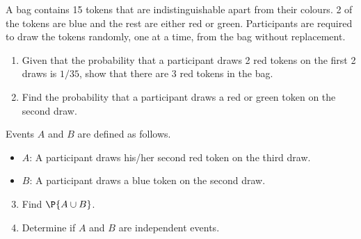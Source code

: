 \begin{problem}
    A bag contains 15 tokens that are indistinguishable apart from their colours. 2 of the tokens are blue and the rest are either red or green. Participants are required to draw the tokens randomly, one at a time, from the bag without replacement.

    \begin{enumerate}
        \item Given that the probability that a participant draws 2 red tokens on the first 2 draws is $1/35$, show that there are 3 red tokens in the bag.
        \item Find the probability that a participant draws a red or green token on the second draw.
    \end{enumerate}

    Events $A$ and $B$ are defined as follows.
    \begin{itemize}
        \item $A$: A participant draws his/her second red token on the third draw.
        \item $B$: A participant draws a blue token on the second draw.
    \end{itemize}

    \begin{enumerate}
        \setcounter{enumi}{2}
        \item Find $\P{A \cup B}$.
        \item Determine if $A$ and $B$ are independent events.
    \end{enumerate}
\end{problem}

